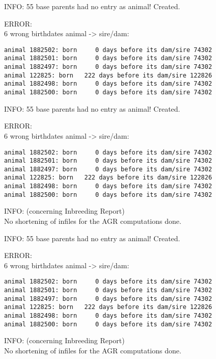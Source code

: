 \item INFO: 55 base parents had no entry as animal! Created.
\item ERROR:\\ 6 wrong birthdates animal -> sire/dam:
\begin{verbatim}
animal 1882502: born     0 days before its dam/sire 74302
animal 1882501: born     0 days before its dam/sire 74302
animal 1882497: born     0 days before its dam/sire 74302
animal 122825: born   222 days before its dam/sire 122826
animal 1882498: born     0 days before its dam/sire 74302
animal 1882500: born     0 days before its dam/sire 74302
\end{verbatim} 
\item INFO: 55 base parents had no entry as animal! Created.
\item ERROR:\\ 6 wrong birthdates animal -> sire/dam:
\begin{verbatim}
animal 1882502: born     0 days before its dam/sire 74302
animal 1882501: born     0 days before its dam/sire 74302
animal 1882497: born     0 days before its dam/sire 74302
animal 122825: born   222 days before its dam/sire 122826
animal 1882498: born     0 days before its dam/sire 74302
animal 1882500: born     0 days before its dam/sire 74302
\end{verbatim} 
\item INFO: (concerning Inbreeding Report)\\
No shortening of infiles for the AGR computations done.\\ 
\item INFO: 55 base parents had no entry as animal! Created.
\item ERROR:\\ 6 wrong birthdates animal -> sire/dam:
\begin{verbatim}
animal 1882502: born     0 days before its dam/sire 74302
animal 1882501: born     0 days before its dam/sire 74302
animal 1882497: born     0 days before its dam/sire 74302
animal 122825: born   222 days before its dam/sire 122826
animal 1882498: born     0 days before its dam/sire 74302
animal 1882500: born     0 days before its dam/sire 74302
\end{verbatim} 
\item INFO: (concerning Inbreeding Report)\\
No shortening of infiles for the AGR computations done.\\ 
